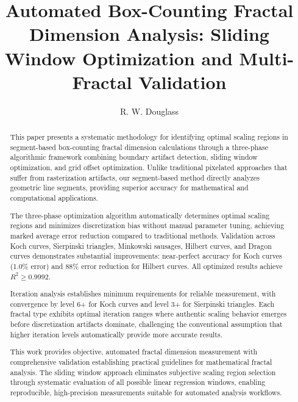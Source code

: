 \documentclass[preprint,12pt]{elsarticle}
\begin{document}
\begin{frontmatter}

\title{Automated Box-Counting Fractal Dimension Analysis: Sliding Window Optimization and Multi-Fractal Validation}

\author{R. W. Douglass}



\begin{abstract}
This paper presents a systematic methodology for identifying optimal scaling regions in segment-based box-counting fractal dimension calculations through a three-phase algorithmic framework combining boundary artifact detection, sliding window optimization, and grid offset optimization. Unlike traditional pixelated approaches that suffer from rasterization artifacts, our segment-based method directly analyzes geometric line segments, providing superior accuracy for mathematical and computational applications.

The three-phase optimization algorithm automatically determines optimal scaling regions and minimizes discretization bias without manual parameter tuning, achieving marked average error reduction compared to traditional methods. Validation across Koch curves, Sierpinski triangles, Minkowski sausages, Hilbert curves, and Dragon curves demonstrates substantial improvements: near-perfect accuracy for Koch curves (1.0\% error) and 88\% error reduction for Hilbert curves. All optimized results achieve $R^2 \geq 0.9992$.

Iteration analysis establishes minimum requirements for reliable measurement, with convergence by level 6+ for Koch curves and level 3+ for Sierpinski triangles. Each fractal type exhibits optimal iteration ranges where authentic scaling behavior emerges before discretization artifacts dominate, challenging the conventional assumption that higher iteration levels automatically provide more accurate results.

This work provides objective, automated fractal dimension measurement with comprehensive validation establishing practical guidelines for mathematical fractal analysis. The sliding window approach eliminates subjective scaling region selection through systematic evaluation of all possible linear regression windows, enabling reproducible, high-precision measurements suitable for automated analysis workflows.
\end{abstract}


\end{frontmatter}
\end{document}
